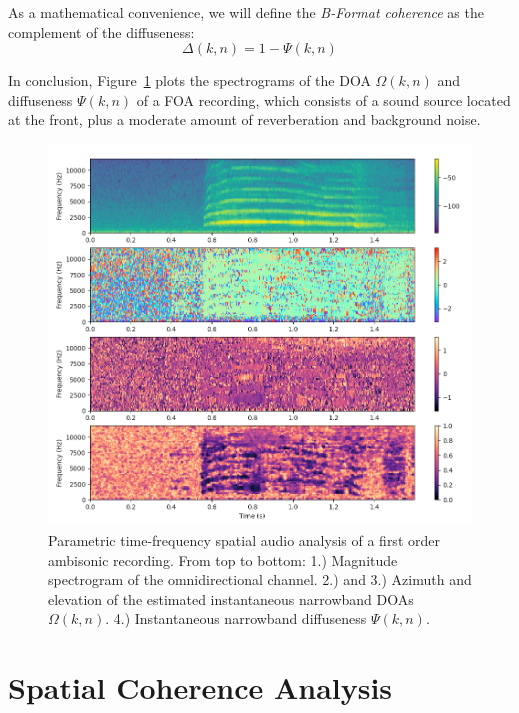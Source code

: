 As a mathematical convenience, we will define the \textit{B-Format coherence} as the complement of the diffuseness:
\begin{equation}
	\Delta(k,n) = 1 - \Psi(k,n) 
	\label{eq:delta}
\end{equation}

In conclusion, Figure~\ref{fig:dirac} plots the spectrograms of the DOA $\Omega(k,n)$ and diffuseness $\Psi(k,n)$ of a FOA recording, which consists of a sound source located at the front, plus a moderate amount of reverberation and background noise. 

\begin{figure}[h!]
	\begin{center}
	\includegraphics[width=1.1\textwidth]{Figures/Introduction/spectrograms.png}
	\caption{Parametric time-frequency spatial audio analysis of a first order ambisonic recording. From top to bottom: 1.) Magnitude spectrogram of the omnidirectional channel. 2.) and 3.) Azimuth and elevation of the estimated instantaneous narrowband DOAs $\Omega(k,n)$. 4.) Instantaneous narrowband diffuseness $\Psi(k,n)$.}
	\label{fig:dirac}
	\end{center}
\end{figure}




\section{Spatial Coherence Analysis}


